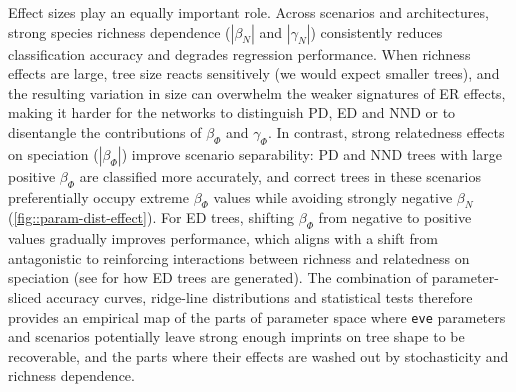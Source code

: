 {Effect sizes play an equally important role. Across scenarios and architectures, strong species richness dependence ($|\beta_N|$ and $|\gamma_N|$) consistently reduces classification accuracy and degrades regression performance. When richness effects are large, tree size reacts sensitively (we would expect smaller trees), and the resulting variation in size can overwhelm the weaker signatures of ER effects, making it harder for the networks to distinguish PD, ED and NND or to disentangle the contributions of $\beta_{\varPhi}$ and $\gamma_{\varPhi}$. In contrast, strong relatedness effects on speciation ($|\beta_{\varPhi}|$) improve scenario separability: PD and NND trees with large positive $\beta_{\varPhi}$ are classified more accurately, and correct trees in these scenarios preferentially occupy extreme $\beta_{\varPhi}$ values while avoiding strongly negative $\beta_N$ (\autoref{fig::param-dist-effect}). For ED trees, shifting $\beta_{\varPhi}$ from negative to positive values gradually improves performance, which aligns with a shift from antagonistic to reinforcing interactions between richness and relatedness on speciation (see \citep{qin_impact_2025} for how ED trees are generated). The combination of parameter-sliced accuracy curves, ridge-line distributions and statistical tests therefore provides an empirical map of the parts of parameter space where \texttt{eve} parameters and scenarios potentially leave strong enough imprints on tree shape to be recoverable, and the parts where their effects are washed out by stochasticity and richness dependence.

}
